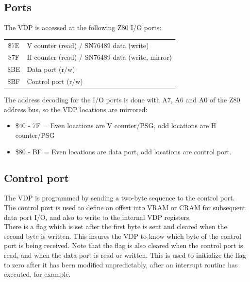 \documentclass{article}
\begin{document}
\subsection{Ports}

The VDP is accessed at the following Z80 I/O ports:

\begin{table}[H]
    \centering
    \begin{tabular}{c|p{3in}}
        \hline
        \hline
          \$7E & V counter (read) / SN76489 data (write)             \\
          \$7F & H counter (read) / SN76489 data (write, mirror)     \\
          \$BE & Data port (r/w)                                     \\
          \$BF & Control port (r/w)                                  \\
    \end{tabular}
\end{table}

The address decoding for the I/O ports is done with A7, A6 and A0 of the Z80
address bus, so the VDP locations are mirrored:

\begin{itemize}
    \item \$40 - 7F = Even locations are V counter/PSG, odd locations are H counter/PSG
    \item \$80 - BF = Even locations are data port, odd locations are control port.
\end{itemize}


\subsection{Control port}

The VDP is programmed by sending a two-byte sequence to the control port. The
control port is used to define an offset into VRAM or CRAM for subsequent data
port I/O, and also to write to the internal VDP registers.
\\

There is a flag which is set after the first byte is sent and cleared when the
second byte is written. This insures the VDP to know which byte of the control
port is being received. Note that the flag is also cleared when the control
port is read, and when the data port is read or written. This is used to
initialize the flag to zero after it has been modified unpredictably, after an
interrupt routine has executed, for example.
\\
\end{document}
